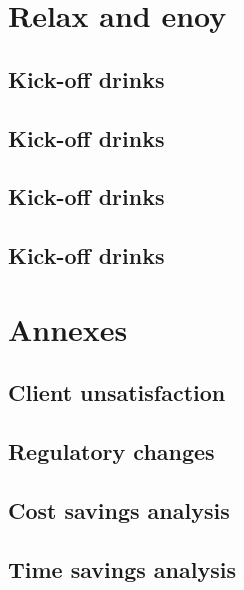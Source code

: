 \documentclass[8pt]{article} %
\begin{document}
\section{Relax and enoy}

\subsection{Kick-off drinks}
\subsection{Kick-off drinks}
\subsection{Kick-off drinks}
\subsection{Kick-off drinks}

\section{Annexes}
\subsection{Client unsatisfaction}
\subsection{Regulatory changes}
\subsection{Cost savings analysis}
\subsection{Time savings analysis}
\end{document}
